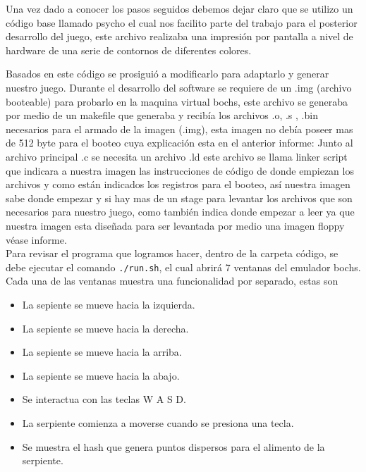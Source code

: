 \documentclass[twocolumn,11pts]{IEEEtran}
\begin{document}
    Una vez dado a conocer los pasos seguidos debemos dejar claro que se utilizo un código base llamado psycho\cite{psycho} el cual nos facilito parte del trabajo para el posterior desarrollo del juego, este archivo realizaba una impresión por pantalla a nivel de hardware de una serie de contornos de diferentes colores.
    
    Basados en este código se prosiguió a modificarlo para adaptarlo y generar nuestro juego. Durante el desarrollo del software se requiere de un .img (archivo booteable) para probarlo en la maquina virtual bochs, este archivo se generaba por medio de un makefile que generaba y recibía los archivos .o, .s , .bin necesarios para el armado de la imagen (.img), esta imagen no debía poseer mas de 512 byte para el booteo cuya explicación esta en el anterior informe\cite{informe}: Junto al archivo principal .c se necesita un archivo .ld este archivo se llama linker script\cite{ld} que indicara a nuestra imagen las instrucciones de código de donde empiezan los archivos y como están indicados los registros para el booteo, así nuestra imagen sabe donde empezar y si hay mas de un stage para levantar los archivos que son necesarios para nuestro juego, como también indica donde empezar a leer ya que nuestra imagen esta diseñada para ser levantada por medio una imagen floppy véase informe\cite{boteo}. 
    \\
Para revisar el programa que logramos hacer, dentro de la carpeta código, se debe ejecutar el comando \texttt{./run.sh}, el cual abrirá 7 ventanas del emulador bochs. Cada una de las ventanas muestra una funcionalidad por separado, estas son

\begin{itemize}
\item La sepiente se mueve hacia la izquierda.
\item La sepiente se mueve hacia la derecha.
\item La sepiente se mueve hacia la arriba.
\item La sepiente se mueve hacia la abajo.
\item Se interactua con las teclas W A S D.
\item La serpiente comienza a moverse cuando se presiona una tecla.
\item Se muestra el hash que genera puntos dispersos para el alimento de la serpiente.
\end{itemize}{}
    
    \\
    
\end{document}
